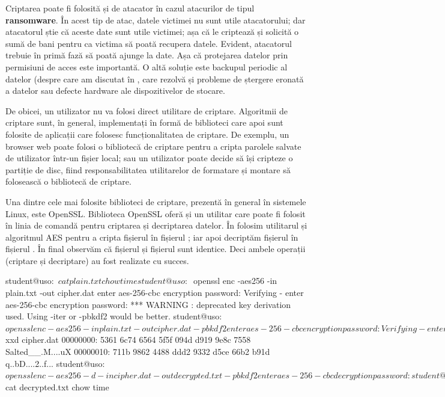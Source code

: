Criptarea poate fi folosită și de atacator în cazul atacurilor de tipul \textbf{ransomware}. În acest tip de atac, datele victimei nu sunt utile atacatorului; dar atacatorul știe că aceste date sunt utile victimei; așa că le criptează și solicită o sumă de bani pentru ca victima să poată recupera datele. Evident, atacatorul trebuie în primă fază să poată ajunge la date. Așa că protejarea datelor prin permisiuni de acces este importantă. O altă soluție este backupul periodic al datelor (despre care am discutat în , care rezolvă și probleme de ștergere eronată a datelor sau defecte hardware ale dispozitivelor de stocare.

De obicei, un utilizator nu va folosi direct utilitare de criptare. Algoritmii de criptare sunt, în general, implementați în formă de biblioteci care apoi sunt folosite de aplicații care folosesc funcționalitatea de criptare. De exemplu, un browser web poate folosi o bibliotecă de criptare pentru a cripta parolele salvate de utilizator într-un fișier local; sau un utilizator poate decide să își cripteze o partiție de disc, fiind responsabilitatea utilitarelor de formatare și montare să folosească o bibliotecă de criptare.

Una dintre cele mai folosite biblioteci de criptare, prezentă în general în sistemele Linux, este OpenSSL. Biblioteca OpenSSL oferă și un utilitar care poate fi folosit în linia de comandă pentru criptarea și decriptarea datelor. În  folosim utilitarul  și algoritmul AES pentru a cripta fișierul  în fișierul ; iar apoi decriptăm fișierul  în fișierul . În final observăm că fișierul  și fișierul  sunt identice. Deci ambele operații (criptare și decriptare) au fost realizate cu succes.

\begin{screen}[caption={Criptare și decriptare folosind openssl},label={lst:sec:openssl}]
student@uso:~$ cat plain.txt
chow time
student@uso:~$ openssl enc -aes256 -in plain.txt -out cipher.dat
enter aes-256-cbc encryption password:
Verifying - enter aes-256-cbc encryption password:
*** WARNING : deprecated key derivation used.
Using -iter or -pbkdf2 would be better.
student@uso:~$ openssl enc -aes256 -in plain.txt -out cipher.dat -pbkdf2
enter aes-256-cbc encryption password:
Verifying - enter aes-256-cbc encryption password:
student@uso:~$ xxd cipher.dat
00000000: 5361 6c74 6564 5f5f 094d d919 9e8c 7558  Salted__.M....uX
00000010: 711b 9862 4488 ddd2 9332 d5ce 66b2 b91d  q..bD....2..f...
student@uso:~$ openssl enc -aes256 -d -in cipher.dat -out decrypted.txt -pbkdf2
enter aes-256-cbc decryption password:
student@uso:~$ cat decrypted.txt
chow time
\end{screen}

